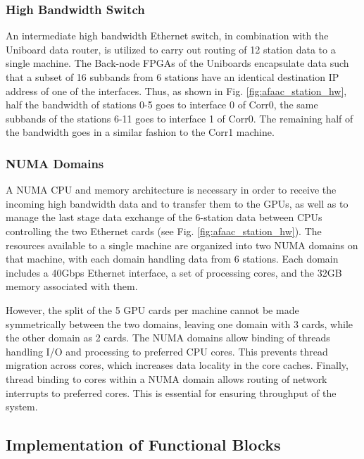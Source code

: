 \documentclass{ws-jai}
\begin{document}
\subsubsection  {High  Bandwidth  Switch}
 An  intermediate  high  bandwidth
Ethernet switch,  in combination with the  Uniboard data router, is  utilized to
carry out routing of  12 station data to a single  machine.  The Back-node FPGAs
of the  Uniboards encapsulate  data such  that a  subset of  16 subbands  from 6
stations   have  an   identical   destination   IP  address   of   one  of   the
interfaces. Thus, as  shown in Fig.  \ref{fig:afaac_station_hw},  half the bandwidth
of stations 0-5 goes to interface 0  of Corr0, the same subbands of the stations
6-11 goes to interface 1 of Corr0.   The remaining half of the bandwidth goes in
a similar fashion to the Corr1 machine.\\

\subsubsection  {NUMA  Domains}
  A  NUMA CPU  and  memory  architecture  is
necessary in order  to receive the incoming high bandwidth  data and to transfer
them to  the GPUs,  as well as  to manage  the last stage  data exchange  of the
6-station  data   between  CPUs   controlling  the   two  Ethernet   cards  (see
Fig. \ref{fig:afaac_station_hw}).  The  resources available to a  single machine are
organized into two NUMA domains on  that machine, with each domain handling data
from 6  stations. Each  domain includes  a 40Gbps Ethernet  interface, a  set of
processing cores, and the 32GB  memory associated with them.

However, the split of  the 5 GPU cards per machine  cannot be made symmetrically
between the two domains, leaving one domain with 3 cards, while the other domain
as  2  cards.  The  NUMA  domains  allow binding  of  threads  handling I/O  and
processing to preferred CPU cores.  This prevents thread migration across cores,
which increases  data locality in the  core caches.  Finally, thread  binding to
cores within  a NUMA domain  allows routing  of network interrupts  to preferred
cores.  This is essential for ensuring throughput of the system.

\subsection {Implementation of Functional  Blocks} 
\end{document}
